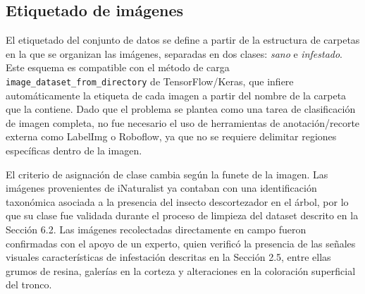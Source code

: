 \subsection{Etiquetado de imágenes}

El etiquetado del conjunto de datos se define a partir de la estructura de carpetas en la que se organizan las imágenes, separadas en dos clases: \textit{sano} e \textit{infestado}. Este esquema es compatible con el método de carga \texttt{image\_dataset\_from\_directory} de TensorFlow/Keras, que infiere automáticamente la etiqueta de cada imagen a partir del nombre de la carpeta que la contiene. Dado que el problema se plantea como una tarea de clasificación de imagen completa, no fue necesario el uso de herramientas de anotación/recorte externa como 
LabelImg o Roboflow, ya que no se requiere delimitar regiones específicas dentro de la imagen.

El criterio de asignación de clase cambia según la funete de la imagen. Las imágenes provenientes de iNaturalist ya contaban con una identificación taxonómica asociada a la presencia del insecto descortezador en el árbol, por lo que su clase fue validada durante el proceso de limpieza del dataset descrito en la Sección 6.2. 
Las imágenes recolectadas directamente en campo fueron confirmadas con el apoyo de un experto, quien verificó la presencia de las señales visuales características de infestación descritas en la Sección 2.5, entre ellas grumos de resina, galerías en la corteza y alteraciones en la coloración superficial del tronco.